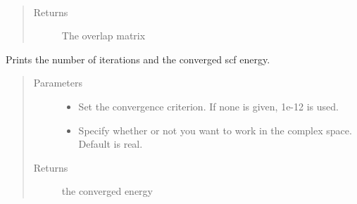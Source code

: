 \documentclass[letterpaper,10pt,english]{sphinxmanual}
\begin{document}
\begin{fulllineitems}
\begin{fulllineitems}
\begin{quote}
\begin{description}
\end{description}\end{quote}

\end{fulllineitems}


\begin{fulllineitems}
\label{\detokenize{RHF:hf.HartreeFock.RHF.MF.get_ovlp}}~\begin{quote}\begin{description}
\item[{Returns}] \leavevmode
The overlap matrix

\end{description}\end{quote}

\end{fulllineitems}


\begin{fulllineitems}
\label{\detokenize{RHF:hf.HartreeFock.RHF.MF.get_scf_solution}}
Prints the number of iterations and the converged scf energy.
\begin{quote}\begin{description}
\item[{Parameters}] \leavevmode\begin{itemize}
\item {} 
 \textendash{} Set the convergence criterion. If none is given, 1e-12 is used.

\item {} 
 \textendash{} Specify whether or not you want to work in the complex space. Default is real.

\end{itemize}

\item[{Returns}] \leavevmode
the converged energy

\end{description}\end{quote}


\end{fulllineitems}
\end{fulllineitems}
\end{document}
